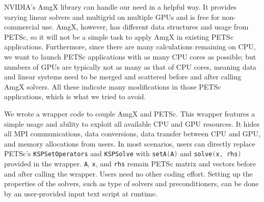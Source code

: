 NVIDIA's AmgX library can handle our need in a helpful way.
It provides varying linear solvers and multigrid on multiple GPUs
and is free for non-commercial use.
AmgX, however, has different data structures and usage from PETSc,
so it will not be a simple task to apply AmgX in existing PETSc applications.
Furthermore,
since there are many calculations remaining on CPU,
we want to launch PETSc applications with as many CPU cores as possible;
but numbers of GPUs are typically not as many as that of CPU cores,
meaning data and linear systems need to be merged and scattered
before and after calling AmgX solvers.
All these indicate many modifications in those PETSc applications, 
which is what we tried to avoid.

We wrote a wrapper code to couple AmgX and PETSc. 
This wrapper features a simple usage and ability to exploit all available
CPU and GPU resources.
It hides all MPI communications, 
data conversions, 
data transfer between CPU and GPU, 
and memory allocations from users.
In most scenarios,
users can directly replace PETSc's
\lstinline[language=C++, basicstyle=\ttfamily]|KSPSetOperators| and 
\lstinline[language=C++, basicstyle=\ttfamily]|KSPSolve| 
with
\lstinline[language=C++, basicstyle=\ttfamily]|setA(A)| and
\lstinline[language=C++, basicstyle=\ttfamily]|solve(x, rhs)| 
provided in the wrapper.
\lstinline[language=C++, basicstyle=\ttfamily]|A|,
\lstinline[language=C++, basicstyle=\ttfamily]|x|, and
\lstinline[language=C++, basicstyle=\ttfamily]|rhs|
remain PETSc matrix and vectors before and after calling the wrapper.
Users need no other coding effort.
Setting up the properties of the solvers, 
such as type of solvers and preconditioners,
can be done by an user-provided input text script at runtime.

